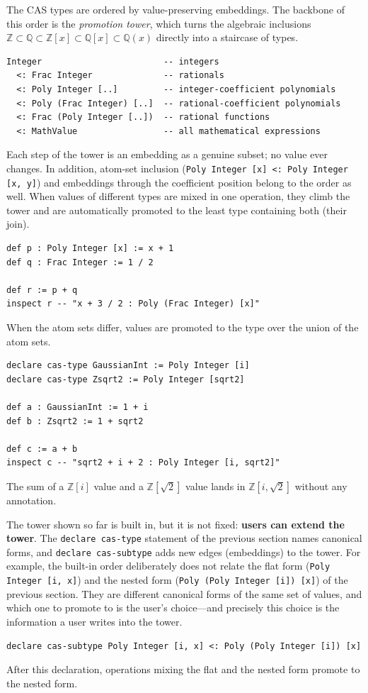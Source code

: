 The CAS types are ordered by value-preserving embeddings.
The backbone of this order is the \emph{promotion tower}, which turns the algebraic inclusions $\mathbb{Z} \subset \mathbb{Q} \subset \mathbb{Z}[x] \subset \mathbb{Q}[x] \subset \mathbb{Q}(x)$ directly into a staircase of types.
\begin{lstlisting}[language=egison,numbers=none]
Integer                        -- integers
  <: Frac Integer              -- rationals
  <: Poly Integer [..]         -- integer-coefficient polynomials
  <: Poly (Frac Integer) [..]  -- rational-coefficient polynomials
  <: Frac (Poly Integer [..])  -- rational functions
  <: MathValue                 -- all mathematical expressions
\end{lstlisting}
Each step of the tower is an embedding as a genuine subset; no value ever changes.
In addition, atom-set inclusion (\lstinline{Poly Integer [x] <: Poly Integer [x, y]}) and embeddings through the coefficient position belong to the order as well.
When values of different types are mixed in one operation, they climb the tower and are automatically promoted to the least type containing both (their join).
\begin{lstlisting}[language=egison,numbers=none]
def p : Poly Integer [x] := x + 1
def q : Frac Integer := 1 / 2

def r := p + q
inspect r -- "x + 3 / 2 : Poly (Frac Integer) [x]"
\end{lstlisting}
When the atom sets differ, values are promoted to the type over the union of the atom sets.
\begin{lstlisting}[language=egison,numbers=none]
declare cas-type GaussianInt := Poly Integer [i]
declare cas-type Zsqrt2 := Poly Integer [sqrt2]

def a : GaussianInt := 1 + i
def b : Zsqrt2 := 1 + sqrt2

def c := a + b
inspect c -- "sqrt2 + i + 2 : Poly Integer [i, sqrt2]"
\end{lstlisting}
The sum of a $\mathbb{Z}[i]$ value and a $\mathbb{Z}[\sqrt{2}]$ value lands in $\mathbb{Z}[i, \sqrt{2}]$ without any annotation.

The tower shown so far is built in, but it is not fixed: \textbf{users can extend the tower}.
The \lstinline{declare cas-type} statement of the previous section names canonical forms, and \lstinline{declare cas-subtype} adds new edges (embeddings) to the tower.
For example, the built-in order deliberately does not relate the flat form (\lstinline{Poly Integer [i, x]}) and the nested form (\lstinline{Poly (Poly Integer [i]) [x]}) of the previous section.
They are different canonical forms of the same set of values, and which one to promote to is the user's choice---and precisely this choice is the information a user writes into the tower.
\begin{lstlisting}[language=egison,numbers=none]
declare cas-subtype Poly Integer [i, x] <: Poly (Poly Integer [i]) [x]
\end{lstlisting}
After this declaration, operations mixing the flat and the nested form promote to the nested form.

